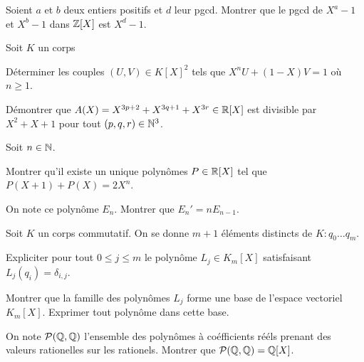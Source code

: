 \documentclass[french]{report}
\begin{document}
\begin{exo}
    Soient \(a\) et \(b\) deux entiers positifs et \(d\) leur pgcd. Montrer que le
    pgcd de \(X^a-1\) et \(X^b-1\) dans \(\mathbb{Z}[X]\) est \(X^d-1\).
\end{exo}

\begin{exo}
    Soit \(K\) un corps
    \begin{q}{1}
        Déterminer les couples \(\left(U, V\right)\in K[X]^2\) tels que
        \(X^nU+\left(1-X\right)V=1\) où \(n\geq 1\).
    \end{q}
    \begin{q}{2}
        Démontrer que \(A(X)=X^{3p+2}+X^{3q+1}+X^{3r}\in\mathbb{R}[X]\) est divisible
        par \(X^2+X+1\) pour tout \(\left(p,q,r\right)\in\mathbb{N}^3\).
    \end{q}
\end{exo}

\begin{exo}
    Soit \(n\in\mathbb{N}\).
    \begin{q}{1}
        Montrer qu'il existe un unique polynômes \(P\in\mathbb{R}[X]\) tel que
        \(P(X+1)+P(X) = 2X^n\).
    \end{q}
    \begin{q}{2}
        On note ce polynôme \(E_n\). Montrer que \(E_n'=nE_{n-1}\).
    \end{q}
\end{exo}

\begin{exo}
    Soit \(K\) un corps commutatif. On se donne \(m+1\) éléments distincts de \(K\colon
    q_0\dots q_m\).
    \begin{q}{1}
        Expliciter pour tout \(0\leq j\leq m\) le polynôme \(L_j\in K_m[X]\)
        satisfaisant \(L_j(q_i) = \delta_{i,j}\).
    \end{q}
    \begin{q}{2}
        Montrer que la famille des polynômes \(L_j\) forme une base de l'espace vectoriel
        \(K_m[X]\). Exprimer tout polynôme dans cette base.
    \end{q}
    \begin{q}{3}
        On note \(\mathcal{P}(\mathbb{Q}, \mathbb{Q})\) l'ensemble des polynômes à coéfficients rééls prenant des valeurs
        rationelles sur les rationels. Montrer que \(\mathcal{P}(\mathbb{Q}, \mathbb{Q})=\mathbb{Q}[X]\).
    \end{q}
\end{exo}
\end{document}
